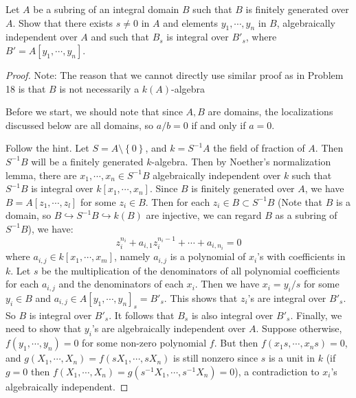 \documentclass{solution}
\begin{document}
\begin{problem}
    Let $A$ be a subring of an integral domain $B$ such that $B$ is finitely generated over $A$. Show that there exists $s \ne 0$ in $A$ and elements $y_1, \cdots, y_n$ in $B$, algebraically independent over $A$ and such that $B_s$ is integral over $B'_s$, where $B' = A[y_1, \cdots, y_n]$.
\end{problem}

\begin{proof}
    {\color{red} Note: The reason that we cannot directly use similar proof as in Problem 18 is that $B$ is not necessarily a $k(A)$-algebra}

    Before we start, we should note that since $A, B$ are domains, the localizations discussed below are all domains, so $a / b = 0$ if and only if $a = 0$.

    Follow the hint. Let $S = A \setminus \left\lbrace 0 \right\rbrace$, and $k = S ^{-1}A$ the field of fraction of $A$. Then $S ^{-1} B$ will be a finitely generated $k$-algebra. Then by Noether's normalization lemma, there are $x_1, \cdots, x_n \in S ^{-1} B$ algebraically independent over $k$ such that $S ^{-1} B$ is integral over $k[x_1, \cdots, x_n]$. Since $B$ is finitely generated over $A$, we have $B = A[z_1, \cdots, z_l]$ for some $z_i \in B$. Then for each $z_i \in B \subset S ^{-1} B$ (Note that $B$ is a domain, so $B \hookrightarrow S ^{-1} B \hookrightarrow k(B)$ are injective, we can regard $B$ as a subring of $S ^{-1} B$), we have:
    $$z_i^{n_i} + a_{i, 1}z_i^{n_i - 1} + \cdots + a_{i, n_i} = 0$$
    where $a_{i, j} \in k[x_1, \cdots, x_m]$, namely $a_{i, j}$ is a polynomial of $x_i$'s with coefficients in $k$. Let $s$ be the multiplication of the denominators of all polynomial coefficients for each $a_{i, j}$ and the denominators of each $x_i$. Then we have $x_i = y_i / s$ for some $y_i \in B$ and $a_{i, j} \in A[y_1, \cdots, y_n]_s = B'_s$. This shows that $z_i$'s are integral over $B'_s$. So $B$ is integral over $B'_s$. It follows that $B_s$ is also integral over $B'_s$. Finally, we need to show that $y_i$'s are algebraically independent over $A$. Suppose otherwise, $f(y_1, \cdots, y_n) = 0$ for some non-zero polynomial $f$. But then $f(x_1s, \cdots, x_ns) = 0$, and $g(X_1, \cdots, X_n) = f(sX_1, \cdots, sX_n)$ is still nonzero since $s$ is a unit in $k$ (if $g = 0$ then $f(X_1, \cdots, X_n) = g(s ^{-1} X_1, \cdots, s ^{-1} X_n) = 0$), a contradiction to $x_i$'s algebraically independent.
\end{proof}
\end{document}
